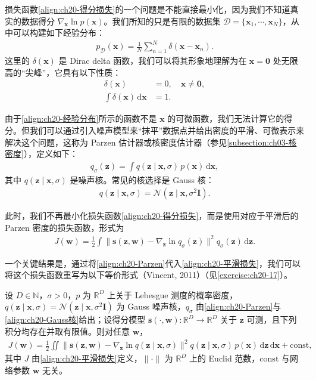 \documentclass[../../main.tex]{subfiles}
\begin{document}
损失函数\eqref{align:ch20-得分损失}的一个问题是不能直接最小化，因为我们不知道真实的数据得分 $\nabla_{\bm{x}}\ln p(\bm{x})$。我们所知的只是有限的数据集 $\mathcal{D}=\{\bm{x}_1,\cdots,\bm{x}_N\}$，从中可以构建如下经验分布：
\begin{align}
p_{\mathcal{D}}(\bm{x})=\frac{1}{N}\sum_{n=1}^{N}\delta(\bm{x}-\bm{x}_n).
\label{align:ch20-经验分布}
\end{align}
这里的 $\delta(\bm{x})$ 是 Dirac delta 函数，我们可以将其形象地理解为在 $\bm{x}=\bm{0}$ 处无限高的“尖峰”，它具有以下性质：
\begin{align}
\delta(\bm{x})&=0,\quad \bm{x}\neq\bm{0},
\label{align:ch20-delta零}\\
\int\delta(\bm{x})\,\mathrm{d}\bm{x}&=1.
\label{align:ch20-delta归一}
\end{align}

由于\eqref{align:ch20-经验分布}所示的函数不是 $\bm{x}$ 的可微函数，我们无法计算它的得分。但我们可以通过引入噪声模型来“抹平”数据点并给出密度的平滑、可微表示来解决这个问题，这称为 Parzen 估计器或核密度估计器（参见\cref{subsection:ch03-核密度}），定义如下：
\begin{align}
q_{\sigma}(\bm{z})=\int q(\bm{z}\mid\bm{x},\sigma)\,p(\bm{x})\,\mathrm{d}\bm{x},
\label{align:ch20-Parzen}
\end{align}
其中 $q(\bm{z}\mid\bm{x},\sigma)$ 是噪声核。常见的核选择是 Gauss 核：
\begin{align}
q(\bm{z}\mid\bm{x},\sigma)=\mathcal{N}(\bm{z}\mid\bm{x},\sigma^2\bm{I}).
\label{align:ch20-Gauss核}
\end{align}

此时，我们不再最小化损失函数\eqref{align:ch20-得分损失}，而是使用对应于平滑后的 Parzen 密度的损失函数，形式为
\begin{align}
J(\bm{w})=\frac{1}{2}\int\big\|\bm{s}(\bm{z},\bm{w})-\nabla_{\bm{z}}\ln q_{\sigma}(\bm{z})\big\|^2q_{\sigma}(\bm{z})\,\mathrm{d}\bm{z}.
\label{align:ch20-平滑损失}
\end{align}

一个关键结果是，通过将\eqref{align:ch20-Parzen}代入\eqref{align:ch20-平滑损失}，我们可以将这个损失函数重写为以下等价形式（Vincent, 2011）（见\cref{exercise:ch20-17}）。

\begin{proposition}[去噪得分匹配]\label{proposition:ch20-去噪得分匹配}
设 $D\in\mathbb{N}$，$\sigma>0$，$p$ 为 $\mathbb{R}^{D}$ 上关于 Lebesgue 测度的概率密度，$q(\bm{z}\mid\bm{x},\sigma)=\mathcal{N}(\bm{z}\mid\bm{x},\sigma^{2}\bm{I})$ 为 Gauss 噪声核，$q_{\sigma}$ 由\eqref{align:ch20-Parzen}与\eqref{align:ch20-Gauss核}给出；设得分模型 $\bm{s}(\cdot,\bm{w}):\mathbb{R}^{D}\to\mathbb{R}^{D}$ 关于 $\bm{z}$ 可测，且下列积分均存在并取有限值。则对任意 $\bm{w}$，
\begin{align}
J(\bm{w})=\frac{1}{2}\iint\big\|\bm{s}(\bm{z},\bm{w})-\nabla_{\bm{z}}\ln q(\bm{z}\mid\bm{x},\sigma)\big\|^2q(\bm{z}\mid\bm{x},\sigma)\,p(\bm{x})\,\mathrm{d}\bm{z}\,\mathrm{d}\bm{x}+\mathrm{const},
\label{align:ch20-等价损失}
\end{align}
其中 $J$ 由\eqref{align:ch20-平滑损失}定义，$\|\cdot\|$ 为 $\mathbb{R}^{D}$ 上的 Euclid 范数，$\mathrm{const}$ 与网络参数 $\bm{w}$ 无关。
\end{proposition}
\end{document}
